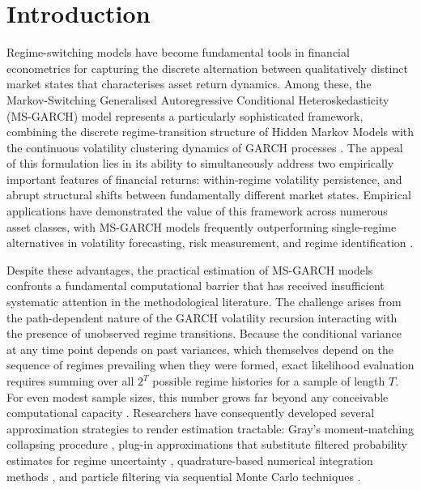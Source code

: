 \documentclass[12pt, a4paper]{article}
\begin{document}
\section{Introduction}

Regime-switching models have become fundamental tools in financial econometrics for capturing the discrete alternation between qualitatively distinct market states that characterises asset return dynamics. Among these, the Markov-Switching Generalised Autoregressive Conditional Heteroskedasticity (MS-GARCH) model represents a particularly sophisticated framework, combining the discrete regime-transition structure of Hidden Markov Models with the continuous volatility clustering dynamics of GARCH processes \citep{Hamilton1989, Haas2004}. The appeal of this formulation lies in its ability to simultaneously address two empirically important features of financial returns: within-regime volatility persistence, and abrupt structural shifts between fundamentally different market states. Empirical applications have demonstrated the value of this framework across numerous asset classes, with MS-GARCH models frequently outperforming single-regime alternatives in volatility forecasting, risk measurement, and regime identification \citep{Klaassen2002, Ardia2018, Guidolin2007}.

Despite these advantages, the practical estimation of MS-GARCH models confronts a fundamental computational barrier that has received insufficient systematic attention in the methodological literature. The challenge arises from the path-dependent nature of the GARCH volatility recursion interacting with the presence of unobserved regime transitions. Because the conditional variance at any time point depends on past variances, which themselves depend on the sequence of regimes prevailing when they were formed, exact likelihood evaluation requires summing over all $2^T$ possible regime histories for a sample of length $T$. For even modest sample sizes, this number grows far beyond any conceivable computational capacity \citep{Gray1996, Haas2004, Bauwens2010}. Researchers have consequently developed several approximation strategies to render estimation tractable: Gray's moment-matching collapsing procedure \citep{Gray1996}, plug-in approximations that substitute filtered probability estimates for regime uncertainty \citep{Klaassen2002, Durbin2012}, quadrature-based numerical integration methods \citep{Tanizaki1996}, and particle filtering via sequential Monte Carlo techniques \citep{Doucet2009, Pitt1999}.
\end{document}
